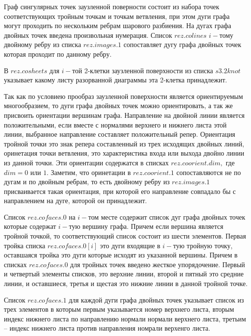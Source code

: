 \documentclass[a4paper,11pt]{report}
\begin{document}
{{{ Граф
сингулярных
точек
заузленной
поверности
состоит
из
набора
точек
соответствующих
тройным
точкам
и
точкам
ветвления,
при
этом
дуги
графа
могут
проходить
по
нескольким
ребрам
шарового
разбиения.
На
дугах
графа
двойных
точек
введена
произвольная
нумерация.
Список $rez.colines$ $i-$тому
двойному
ребру
из
списка $rez.images.1$ сопоставляет
дугу
графа
двойных
точек
которая
проходит
по
данному
ребру. 

 В $rez.cosheets$ для $i-$той
2-клетки
заузленной
поверхности
из
списка $s3.2knot$ указывает
какому
листу
разорванной
диаграммы
эта
2-клетка
принадлежит. 

 Так
как по
условиею
прообраз
заузленной
поверхности
является
ориентируемым
многообразием,
то
дуги
графа
двойных
точек
можно
ориентировать,
а так
же
присвоить
ориентации
вершинам
графа.
Направление
на
двойной
линии
является
положительными,
если
вместе
с
нормалями
верхнего
и
нижнего
листа
этой
линии,
выбранное
направление
составляет
положительный
репер.
Ориентация
тройной
точки
это
знак
репера
составленный
из
трех
исходящих
двойных
линий,
оринетация
точки
ветвления,
это
характеристика
входа
или
выхода
двойно
линии
из
данной
точки.
Эти
ориентации
содержатся
в
списках $rez.coorient.dim,$ где $dim=0$ или $1.$ Заметим,
что
оринетации
в $rez.coorient.1$ сопоставляются
не по
дугам
и по
двойным
ребрам,
то
есть
двойному
ребру
из $rez.images.1$ присваивается
такая
ориентация,
при
которой
его
направление
совпадало
бы с
направлением
на
дуге,
которой
он
принадлежит. 

 Список $rez.cofaces.0$ на $i-$том
месте
содержит
список
дуг
графа
двойных
точек
которые
содержат $i-$тую
вершину
графа.
Причем
если
вершина
является
тройной
точкой,
то
соответствующий
список
состоит
из
шести
элементов.
Первая
тройка
списка $rez.cofaces.0[i]$ это
дуги
входящие
в $i-$тую
тройную
точку,
оставшаяся
тройка
это
дуги
которые
исходят
из
указанной
вершины.
Причем
в
списках $rez.cofaces.0$ для
тройных
точек
введено
жесткое
упорядочение.
Первый
и
четвертый
элементы
списков,
это
верхние
линии,
второй
и
пятный
это
средние
линии,
и
оставшиеся,
третья
и
щестая
это
нижние
линии
в
данной
тройной
точке. 

 Список $rez.cofaces.1$ для
каждой
дуги
графа
двойных
точек
указывает
список
из
трех
элементов
в
которым
первым
указывается
номер
верхнего
листа,
вторым
индекс
нижнего
листа
по
направлению
нормали
нормали
верхнего
листа,
третьим
--
индекс
нижнего
листа
против
направления
номрали
верхенго
листа. }

 }

 }
\end{document}
